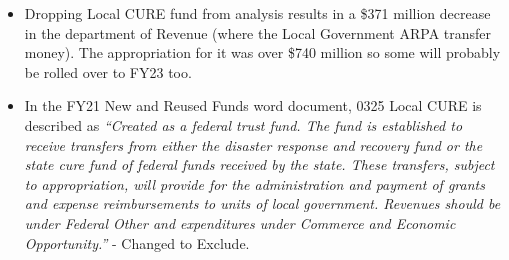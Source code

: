 \documentclass[
  letterpaper,
  DIV=11,
  numbers=noendperiod]{scrreport}
\newenvironment{Shaded}{\begin{snugshade}}{\end{snugshade}}
\newcommand{\AttributeTok}[1]{\textcolor[rgb]{0.40,0.45,0.13}{#1}}
\newcommand{\ConstantTok}[1]{\textcolor[rgb]{0.56,0.35,0.01}{#1}}
\newcommand{\FunctionTok}[1]{\textcolor[rgb]{0.28,0.35,0.67}{#1}}
\newcommand{\NormalTok}[1]{\textcolor[rgb]{0.00,0.23,0.31}{#1}}
\newcommand{\OtherTok}[1]{\textcolor[rgb]{0.00,0.23,0.31}{#1}}
\newcommand{\SpecialCharTok}[1]{\textcolor[rgb]{0.37,0.37,0.37}{#1}}
\newcommand{\StringTok}[1]{\textcolor[rgb]{0.13,0.47,0.30}{#1}}
\begin{document}
\begin{itemize}
\item
  Dropping Local CURE fund from analysis results in a \$371 million
  decrease in the department of Revenue (where the Local Government ARPA
  transfer money). The appropriation for it was over \$740 million so
  some will probably be rolled over to FY23 too.
\item
  In the FY21 New and Reused Funds word document, 0325 Local CURE is
  described as \emph{``Created as a federal trust fund. The fund is
  established to receive transfers from either the disaster response and
  recovery fund or the state cure fund of federal funds received by the
  state. These transfers, subject to appropriation, will provide for the
  administration and payment of grants and expense reimbursements to
  units of local government. Revenues should be under Federal Other and
  expenditures under Commerce and Economic Opportunity.''} - Changed to
  Exclude.
\end{itemize}

\begin{Shaded}
\end{Shaded}
\end{document}
